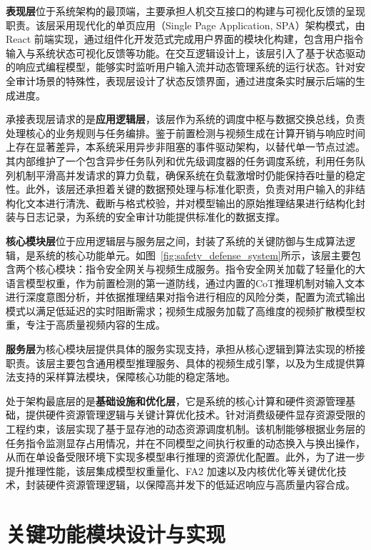 \textbf{表现层}位于系统架构的最顶端，主要承担人机交互接口的构建与可视化反馈的呈现职责。该层采用现代化的单页应用（Single Page Application, SPA）架构模式，由 React 前端实现，通过组件化开发范式完成用户界面的模块化构建，包含用户指令输入与系统状态可视化反馈等功能。在交互逻辑设计上，该层引入了基于状态驱动的响应式编程模型，能够实时监听用户输入流并动态管理系统的运行状态。针对安全审计场景的特殊性，表现层设计了状态反馈界面，通过进度条实时展示后端的生成进度。

承接表现层请求的是\textbf{应用逻辑层}，该层作为系统的调度中枢与数据交换总线，负责处理核心的业务规则与任务编排。鉴于前置检测与视频生成在计算开销与响应时间上存在显著差异，本系统采用异步非阻塞的事件驱动架构，以替代单一节点过滤。其内部维护了一个包含异步任务队列和优先级调度器的任务调度系统，利用任务队列机制平滑高并发请求的算力负载，确保系统在负载激增时仍能保持吞吐量的稳定性。此外，该层还承担着关键的数据预处理与标准化职责，负责对用户输入的非结构化文本进行清洗、截断与格式校验，并对模型输出的原始推理结果进行结构化封装与日志记录，为系统的安全审计功能提供标准化的数据支撑。

\textbf{核心模块层}位于应用逻辑层与服务层之间，封装了系统的关键防御与生成算法逻辑，是系统的核心功能单元。如图~\ref{fig:safety_defense_system}所示，该层主要包含两个核心模块：指令安全网关与视频生成服务。指令安全网关加载了轻量化的大语言模型权重，作为前置检测的第一道防线，通过内置的CoT推理机制对输入文本进行深度意图分析，并依据推理结果对指令进行相应的风险分类，配置为流式输出模式以满足低延迟的实时阻断需求；视频生成服务加载了高维度的视频扩散模型权重，专注于高质量视频内容的生成。

\textbf{服务层}为核心模块层提供具体的服务实现支持，承担从核心逻辑到算法实现的桥接职责。该层主要包含通用模型推理服务、具体的视频生成引擎，以及为生成提供算法支持的采样算法模块，保障核心功能的稳定落地。

处于架构最底层的是\textbf{基础设施和优化层}，它是系统的核心计算和硬件资源管理基础，提供硬件资源管理逻辑与关键计算优化技术。针对消费级硬件显存资源受限的工程约束，该层实现了基于显存池的动态资源调度机制。该机制能够根据业务层的任务指令监测显存占用情况，并在不同模型之间执行权重的动态换入与换出操作，从而在单设备受限环境下实现多模型串行推理的资源优化配置。此外，为了进一步提升推理性能，该层集成模型权重量化、FA2 加速以及内核优化等关键优化技术，封装硬件资源管理逻辑，以保障高并发下的低延迟响应与高质量内容合成。

\section{关键功能模块设计与实现}

